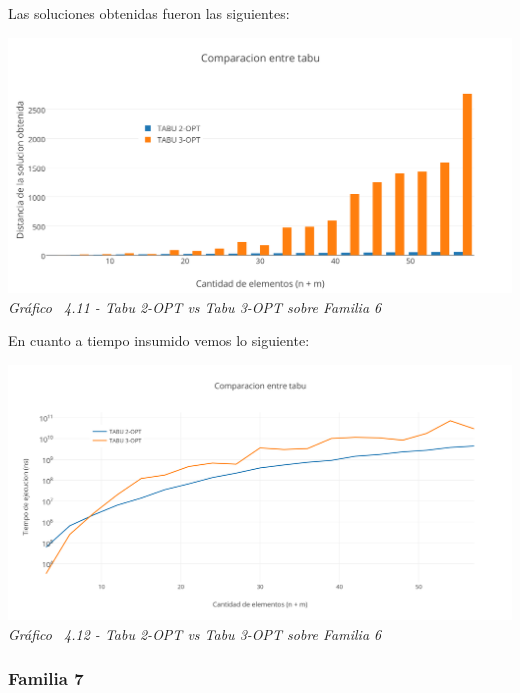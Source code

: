 Las soluciones obtenidas fueron las siguientes:

\vspace*{0.3cm} \vspace*{0.3cm}
  \begin{center}
 \includegraphics[scale=0.5]{./EJ4/comparativosinorden.png}\\
 {            \textit{Gráfico \ 4.11 - Tabu 2-OPT vs Tabu 3-OPT sobre Familia 6}}
  \end{center}
  \vspace*{0.3cm}

En cuanto a tiempo insumido vemos lo siguiente:

\vspace*{0.3cm} \vspace*{0.3cm}
  \begin{center}
 \includegraphics[scale=0.5]{./EJ4/comparacionsinorden1.png}\\
 {            \textit{Gráfico \ 4.12 - Tabu 2-OPT vs Tabu 3-OPT sobre Familia 6}}
  \end{center}
  \vspace*{0.3cm}




\subsubsection*{Familia 7}


